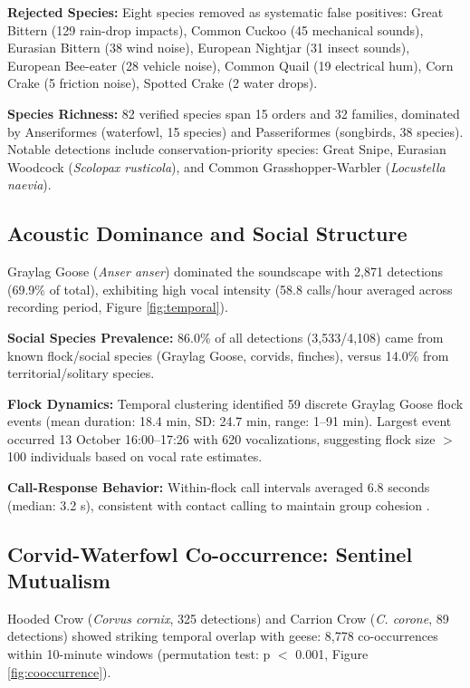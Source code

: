 \documentclass[twocolumn]{article}
\begin{document}
\textbf{Rejected Species:} Eight species removed as systematic false positives: Great Bittern (129 rain-drop impacts), Common Cuckoo (45 mechanical sounds), Eurasian Bittern (38 wind noise), European Nightjar (31 insect sounds), European Bee-eater (28 vehicle noise), Common Quail (19 electrical hum), Corn Crake (5 friction noise), Spotted Crake (2 water drops).

\textbf{Species Richness:} 82 verified species span 15 orders and 32 families, dominated by Anseriformes (waterfowl, 15 species) and Passeriformes (songbirds, 38 species). Notable detections include conservation-priority species: Great Snipe, Eurasian Woodcock (\textit{Scolopax rusticola}), and Common Grasshopper-Warbler (\textit{Locustella naevia}).

\subsection{Acoustic Dominance and Social Structure}

Graylag Goose (\textit{Anser anser}) dominated the soundscape with 2,871 detections (69.9\% of total), exhibiting high vocal intensity (58.8 calls/hour averaged across recording period, Figure \ref{fig:temporal}).

\textbf{Social Species Prevalence:} 86.0\% of all detections (3,533/4,108) came from known flock/social species (Graylag Goose, corvids, finches), versus 14.0\% from territorial/solitary species.

\textbf{Flock Dynamics:} Temporal clustering identified 59 discrete Graylag Goose flock events (mean duration: 18.4 min, SD: 24.7 min, range: 1--91 min). Largest event occurred 13 October 16:00--17:26 with 620 vocalizations, suggesting flock size $>$100 individuals based on vocal rate estimates.

\textbf{Call-Response Behavior:} Within-flock call intervals averaged 6.8 seconds (median: 3.2 s), consistent with contact calling to maintain group cohesion \citep{Black2019}.

\subsection{Corvid-Waterfowl Co-occurrence: Sentinel Mutualism}

Hooded Crow (\textit{Corvus cornix}, 325 detections) and Carrion Crow (\textit{C. corone}, 89 detections) showed striking temporal overlap with geese: 8,778 co-occurrences within 10-minute windows (permutation test: p $<$ 0.001, Figure \ref{fig:cooccurrence}).
\end{document}
